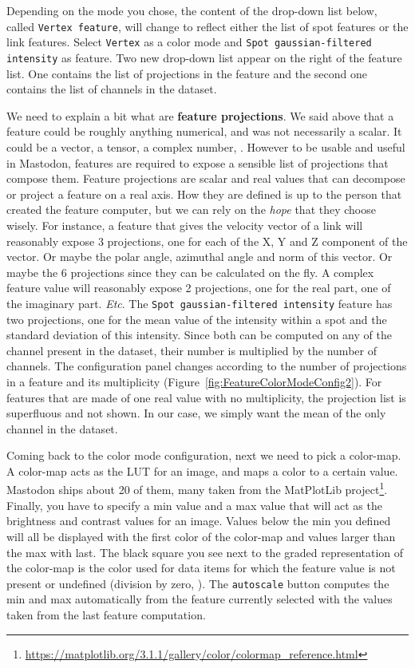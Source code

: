 \noindent Depending on the mode you chose, the content of the drop-down list below, called \texttt{Vertex feature}, will change to reflect either the list of spot features or the link features.
Select \texttt{Vertex} as a color mode and \texttt{Spot gaussian-filtered intensity} as feature.
Two new drop-down list appear on the right of the feature list. 
One contains the list of projections in the feature and the second one contains the list of channels in the dataset. 

We need to explain a bit what are \textbf{feature projections}.
We said above that a feature could be roughly anything numerical, and was not necessarily a scalar. 
It could be a vector, a tensor, a complex number, \etc.
However to be usable and useful in Mastodon, features are required to expose a sensible list of projections that compose them.
Feature projections are scalar and real values that can decompose or project a feature on a real axis.
How they are defined is up to the person that created the feature computer, but we can rely on the \textit{hope} that they choose wisely. 
For instance, a feature that gives the velocity vector of a link will reasonably expose 3 projections, one for each of the X, Y and Z component of the vector. 
Or maybe the polar angle, azimuthal angle and norm of this vector.
Or maybe the 6 projections since they can be calculated on the fly. 
A complex feature value will reasonably expose 2 projections, one for the real part, one of the imaginary part.
\textit{Etc}.
The \texttt{Spot gaussian-filtered intensity} feature has two projections, one for the mean value of the intensity within a spot and the standard deviation of this intensity.
Since both can be computed on any of the channel present in the dataset, their number is multiplied by the number of channels. 
The configuration panel changes according to the number of projections in a feature and its multiplicity (Figure~\ref{fig:FeatureColorModeConfig2}). 
For features that are made of one real value with no multiplicity, the projection list is superfluous and not shown.
In our case, we simply want the mean of the only channel in the dataset.

Coming back to the color mode configuration, next we need to pick a color-map.
A color-map acts as the LUT for an image, and maps a color to a certain value. 
Mastodon ships about 20 of them, many taken from the MatPlotLib project\footnote{\url{https://matplotlib.org/3.1.1/gallery/color/colormap_reference.html}}.
Finally, you have to specify a min value and a max value that will act as the brightness and contrast values for an image.
Values below the min you defined will all be displayed with the first color of the color-map and values larger than the max with last.
The black square you see next to the graded representation of the color-map is the color used for data items for which the feature value is not present or undefined (division by zero, \etc).
The \texttt{autoscale} button computes the min and max automatically from the feature currently selected with the values taken from the last feature computation.

